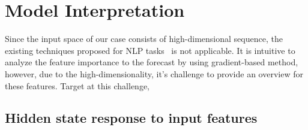 \section{Model Interpretation}

Since the input space of our case consists of high-dimensional sequence, the existing techniques proposed for NLP tasks~\cite{ming2017understanding, strobelt2018lstmvis} is not applicable. It is intuitive to analyze the feature importance to the forecast by using gradient-based method, however, due to the high-dimensionality, it's challenge to provide an overview for these features. Target at this challenge, 


\subsection{Hidden state response to input features}




